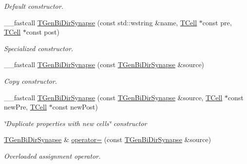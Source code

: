 \begin{DoxyCompactItemize}
\begin{DoxyCompactList}\small\item\em Default constructor. \end{DoxyCompactList}\item 
\hypertarget{class_t_gen_bi_dir_synapse_ad203d4920f37fb6bd4e1b84d857956f8}{\+\_\+\+\_\+fastcall \hyperlink{class_t_gen_bi_dir_synapse_ad203d4920f37fb6bd4e1b84d857956f8}{T\+Gen\+Bi\+Dir\+Synapse} (const std\+::wstring \&name, \hyperlink{class_t_cell}{T\+Cell} $\ast$const pre, \hyperlink{class_t_cell}{T\+Cell} $\ast$const post)}\label{class_t_gen_bi_dir_synapse_ad203d4920f37fb6bd4e1b84d857956f8}

\begin{DoxyCompactList}\small\item\em Specialized constructor. \end{DoxyCompactList}\item 
\hypertarget{class_t_gen_bi_dir_synapse_a6ea172aa2c8b0ce676caa4f91e52a224}{\+\_\+\+\_\+fastcall \hyperlink{class_t_gen_bi_dir_synapse_a6ea172aa2c8b0ce676caa4f91e52a224}{T\+Gen\+Bi\+Dir\+Synapse} (const \hyperlink{class_t_gen_bi_dir_synapse}{T\+Gen\+Bi\+Dir\+Synapse} \&source)}\label{class_t_gen_bi_dir_synapse_a6ea172aa2c8b0ce676caa4f91e52a224}

\begin{DoxyCompactList}\small\item\em Copy constructor. \end{DoxyCompactList}\item 
\hypertarget{class_t_gen_bi_dir_synapse_afe8e90216eb7cc5c8123216a64788383}{\+\_\+\+\_\+fastcall \hyperlink{class_t_gen_bi_dir_synapse_afe8e90216eb7cc5c8123216a64788383}{T\+Gen\+Bi\+Dir\+Synapse} (const \hyperlink{class_t_gen_bi_dir_synapse}{T\+Gen\+Bi\+Dir\+Synapse} \&source, \hyperlink{class_t_cell}{T\+Cell} $\ast$const new\+Pre, \hyperlink{class_t_cell}{T\+Cell} $\ast$const new\+Post)}\label{class_t_gen_bi_dir_synapse_afe8e90216eb7cc5c8123216a64788383}

\begin{DoxyCompactList}\small\item\em \char`\"{}\+Duplicate properties with new cells\char`\"{} constructor \end{DoxyCompactList}\item 
\hypertarget{class_t_gen_bi_dir_synapse_ad949c89ba1e3ea34ca26c85912669597}{\hyperlink{class_t_gen_bi_dir_synapse}{T\+Gen\+Bi\+Dir\+Synapse} \& \hyperlink{class_t_gen_bi_dir_synapse_ad949c89ba1e3ea34ca26c85912669597}{operator=} (const \hyperlink{class_t_gen_bi_dir_synapse}{T\+Gen\+Bi\+Dir\+Synapse} \&source)}\label{class_t_gen_bi_dir_synapse_ad949c89ba1e3ea34ca26c85912669597}

\begin{DoxyCompactList}\small\item\em Overloaded assignment operator. \end{DoxyCompactList}\end{DoxyCompactItemize}
